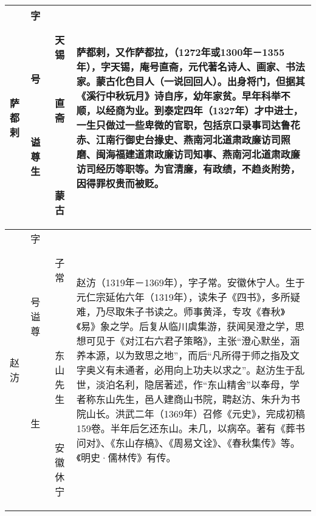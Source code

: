 \begin{longtable}{|>{\centering\namefont\heiti}m{2em}|>{\centering\tiny}m{3.0em}|>{\xzfont\kaiti}m{7.3em}|}
 萨都剌 & \begin{description}
 \item[字] 天锡
 \item[号] 直斋
 \item[谥] 
 \item[尊] 
 \item[生] 蒙古
 \end{description} & 萨都剌，又作萨都拉，（1272年或1300年－1355年），字天锡，庵号直斋，元代著名诗人、画家、书法家。蒙古化色目人（一说回回人）。出身将门，但据其《溪行中秋玩月》诗自序，幼年家贫。早年科举不顺，以经商为业。到泰定四年（1327年）才中进士，一生只做过一些卑微的官职，包括京口录事司达鲁花赤、江南行御史台掾史、燕南河北道肃政廉访司照磨、闽海福建道肃政廉访司知事、燕南河北道肃政廉访司经历等职等。为官清廉，有政绩，不趋炎附势，因得罪权贵而被贬。 \tabularnewline\hline
 赵汸 & \begin{description}
 \item[字] 子常
 \item[号] 
 \item[谥] 
 \item[尊] 东山先生
 \item[生] 安徽休宁
 \end{description} & 赵汸（1319年－1369年），字子常。安徽休宁人。生于元仁宗延佑六年（1319年），读朱子《四书》，多所疑难，乃尽取朱子书读之。师事黄泽，专攻《春秋》《易》象之学。后复从临川虞集游，获闻吴澄之学，思想可见于《对江右六君子策略》，主张“澄心默坐，涵养本源，以为致思之地”，而后“凡所得于师之指及文字奥义有未通者，必用向上功夫以求之”。赵汸生于乱世，淡泊名利，隐居著述，作“东山精舍”以奉母，学者称东山先生，邑人建商山书院，聘赵汸、朱升为书院山长。洪武二年（1369年）召修《元史》，完成初稿159卷。半年后乞还东山。未几，以病卒。著有《葬书问对》、《东山存槁》、《周易文诠》、《春秋集传》等。《明史·儒林传》有传。 \tabularnewline
 \bottomrule
\end{longtable}


